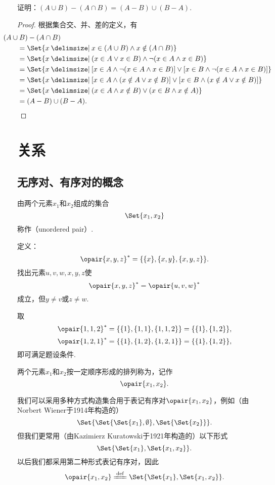 \begin{example}
证明：\((A \cup B) - (A \cap B) = (A-B)\cup(B-A)\).
\begin{proof}
根据集合交、并、差的定义，有
\begin{align*}
&\hspace{-20pt}
(A \cup B) - (A \cap B) \\
&= \Set{ x \given x \in (A \cup B) \land x \notin (A \cap B) } \\
&= \Set{ x \given (x \in A \lor x \in B) \land \neg(x \in A \land x \in B) } \\
&= \Set{ x \given [x \in A \land \neg(x \in A \land x \in B)]
 \lor [x \in B \land \neg(x \in A \land x \in B)] } \\
&= \Set{ x \given [x \in A \land (x \notin A \lor x \notin B)]
 \lor [x \in B \land (x \notin A \lor x \notin B)] } \\
&= \Set{ x \given (x \in A \land x \notin B) \lor (x \in B \land x \notin A) } \\
&= (A-B)\cup(B-A).
\qedhere
\end{align*}
\end{proof}
\end{example}

\section{关系}
\subsection{无序对、有序对的概念}
\begin{definition}[无序对]
由两个元素\(x_1\)和\(x_2\)组成的集合\[
\Set{x_1, x_2}
\]称作（unordered pair）.
\end{definition}

\begin{example}
定义：\[
\opair{x,y,z}^* = \{\{x\},\{x,y\},\{x,y,z\}\}.
\]找出元素\(u,v,w,x,y,z\)使\[
\opair{x,y,z}^* = \opair{u,v,w}^*
\]成立，但\(y \neq v\)或\(z \neq w\).
\begin{solution}
取\[
\opair{1,1,2}^* = \{\{1\},\{1,1\},\{1,1,2\}\} = \{\{1\},\{1,2\}\},
\]\[
\opair{1,2,1}^* = \{\{1\},\{1,2\},\{1,2,1\}\} = \{\{1\},\{1,2\}\},
\]即可满足题设条件.
\end{solution}
\end{example}

\begin{definition}[有序对]
两个元素\(x_1\)和\(x_2\)按一定顺序形成的排列称为，记作\[
\opair{x_1,x_2}.
\]

我们可以采用多种方式构造集合用于表记有序对\(\opair{x_1,x_2}\)，例如（由Norbert Wiener于1914年构造的）
\[
\Set{ \Set{ \Set{x_1}, \emptyset }, \Set{ \Set{ x_2 } } }.
\]
但我们更常用（由Kazimierz Kuratowski于1921年构造的）以下形式
\[
\Set{ \Set{x_1}, \Set{x_1, x_2} }.
\]以后我们都采用第二种形式表记有序对，因此\[
\opair{x_1,x_2}
\defeq
\Set{ \Set{x_1}, \Set{x_1, x_2} }.
\]
\end{definition}

